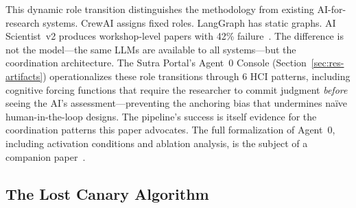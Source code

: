 \documentclass{article}
\begin{document}
\noindent
This dynamic role transition distinguishes the methodology from existing AI-for-research
systems. CrewAI assigns fixed roles. LangGraph has static graphs. AI Scientist~v2
produces workshop-level papers with 42\% failure~\citep{lu2024aiscientist}. The
difference is not the model---the same LLMs are available to all systems---but the
coordination architecture. The Sutra Portal's Agent~0 Console
(Section~\ref{sec:res-artifacts}) operationalizes these role transitions through 6 HCI
patterns, including cognitive forcing functions that require the researcher to commit
judgment \emph{before} seeing the AI's assessment---preventing the anchoring bias that
undermines na\"ive human-in-the-loop designs. The pipeline's success is itself evidence
for the coordination patterns this paper advocates. The full formalization of Agent~0,
including activation conditions and ablation analysis, is the subject of a companion
paper~\citep{viswanathan2026agent0}.

\subsection{The Lost Canary Algorithm}
\label{sec:meth-canary}
\end{document}
